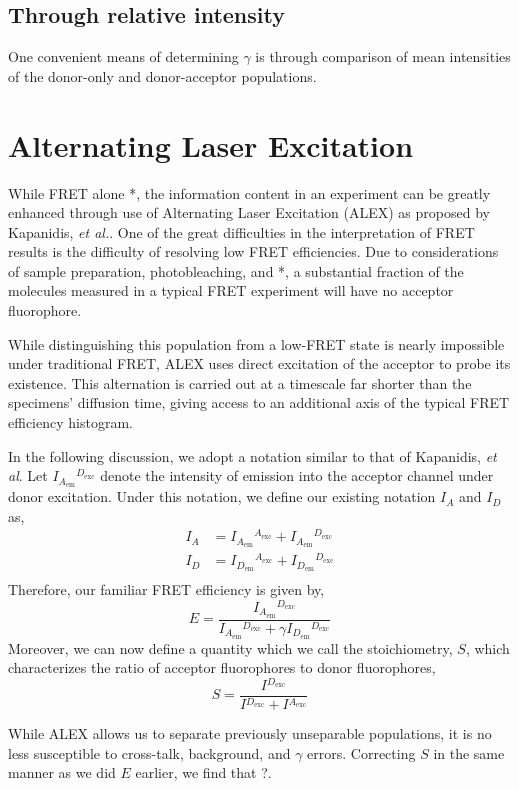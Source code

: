 \documentclass{article}
\newcommand{\emm}[1]{\ensuremath{_{#1_\mathrm{em}}}}   %
\newcommand{\exc}[1]{\ensuremath{^{#1_\mathrm{exc}}}}  %
\newcommand{\I}[2]{\ensuremath{I\emm{#1}\exc{#2}}}
\begin{document}
\subsection{Through relative intensity}

One convenient means of determining $\gamma$ is through comparison of 
mean intensities of the donor-only and donor-acceptor populations. 


\section{Alternating Laser Excitation}
While FRET alone *, the information content in an experiment can be
greatly enhanced through use of Alternating Laser Excitation (ALEX) as
proposed by Kapanidis, {\it et al.}\cite{Kapanidis2005}. One of the
great difficulties in the interpretation of FRET results is the
difficulty of resolving low FRET efficiencies. Due to considerations
of sample preparation, photobleaching, and *, a substantial fraction
of the molecules measured in a typical FRET experiment will have no
acceptor fluorophore.

While distinguishing this population from a low-FRET state is nearly
impossible under traditional FRET, ALEX uses direct excitation of the
acceptor to probe its existence. This alternation is carried out at a
timescale far shorter than the specimens' diffusion time, giving
access to an additional axis of the typical FRET efficiency histogram.

In the following discussion, we adopt a notation similar to that of
Kapanidis, {\it et al}. Let \I{A}{D} denote the intensity of emission
into the acceptor channel under donor excitation. Under this notation,
we define our existing notation $I_A$ and $I_D$ as,
\begin{align*}
  I_A & = \I{A}{A} + \I{A}{D} \\
  I_D & = \I{D}{A} + \I{D}{D} \\
\end{align*}
Therefore, our familiar FRET efficiency is given by,
\[ E = \frac{\I{A}{D}}{\I{A}{D} + \gamma \I{D}{D}} \]
Moreover, we can now define a quantity which we call the
stoichiometry, $S$, which characterizes the ratio of acceptor
fluorophores to donor fluorophores,
\[ S = \frac{I\exc{D}}{I\exc{D} + I\exc{A}} \]

While ALEX allows us to separate previously unseparable populations,
it is no less susceptible to cross-talk, background, and $\gamma$
errors. Correcting $S$ in the same manner as we did $E$ earlier, we
find that ?.
\end{document}
